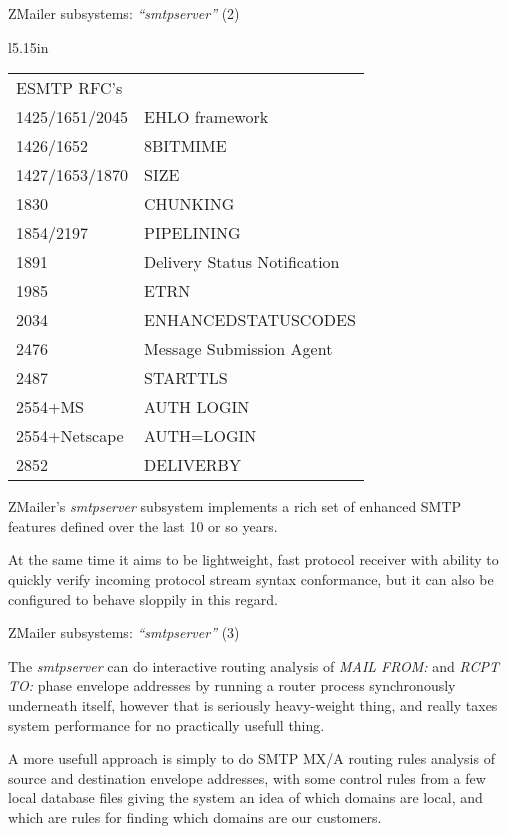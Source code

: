 \documentclass[a4paper,landscape]{slides}
\newcommand{\ZM}{ZMailer}
\begin{document}


\begin{slide}
\centerline{\large \ZM{} subsystems: {\em ``smtpserver''} (2)}

\begin{wrapfigure}[12]{l}{5.15in}
\tiny
\begin{tabular}{ll}
ESMTP RFC's \\

1425/1651/2045 & EHLO framework \\
1426/1652 & 8BITMIME \\
1427/1653/1870 & SIZE \\
1830 & CHUNKING \\
1854/2197 & PIPELINING \\
1891 & Delivery Status Notification \\
1985 & ETRN \\
2034 & ENHANCEDSTATUSCODES \\
2476 & Message Submission Agent \\
2487 & STARTTLS \\
2554+MS & AUTH LOGIN \\
2554+Netscape & AUTH=LOGIN \\
2852 & DELIVERBY \\
\end{tabular}
\end{wrapfigure}
\ZM's {\em smtpserver} subsystem implements a rich set of enhanced SMTP
features defined over the last 10 or so years.

At the same time it aims to be lightweight, fast protocol receiver with
ability to quickly verify incoming protocol stream syntax conformance,
but it can also be configured to behave sloppily in this regard.

\vfill
\end{slide}

\begin{slide}
\centerline{\large \ZM{} subsystems: {\em ``smtpserver''} (3)}

The {\em smtpserver} can do interactive routing analysis of
{\em MAIL FROM:} and {\em RCPT TO:} phase envelope addresses
by running a router process synchronously underneath itself,
however that is seriously heavy-weight thing, and really taxes
system performance for no practically usefull thing.

A more usefull approach is simply to do SMTP MX/A routing rules
analysis of source and destination envelope addresses, with
some control rules from a few local database files giving the
system an idea of which domains are local, and which are rules
for finding which domains are our customers.

\vfill
\end{slide}
\end{document}
